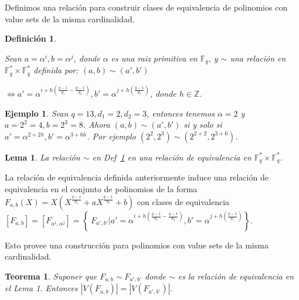 \documentclass[landscape,final,paperwidth=24in,paperheight=36in]{baposter}
\newtheorem*{ejemplo*}{Ejemplo}
\newtheorem{definicion}{Definici\'on}
\newtheorem{lema}{Lema}
\newtheorem{teorema}{Teorema}
\begin{document}
\begin{poster}
{Definimos una relaci\'on para construir clases de equivalencia de polinomios con value sets de la misma cardinalidad.


\begin{definicion}\label{relaci\'on}

  Sean $a = \alpha^i, b = \alpha^j$, donde $\alpha$ es una raiz primitiva en $\mathbb{F}_q$, y $\sim$ una relaci\'on en $\mathbb{F}_q^* \times \mathbb{F}_q^*$ definida por: $(a,b) \sim (a', b')$ 

  $\Longleftrightarrow a' = \alpha^{i+h(\frac{q-1}{d_1} - \frac{q-1}{d_2})}, b' = \alpha^{j+h(\frac{q-1}{d_1})}$, donde $h \in \mathbb{Z}$.

\end{definicion}

  \begin{ejemplo*}
    Sean $q = 13, d_1 = 2, d_2 = 3$, entonces tenemos $\alpha = 2$ y $a = 2^2 = 4, b = 2^3 = 8$. Ahora $(a,b) \sim (a',b')$ si y solo si
    $a' = \alpha^{2+2h}, b' = \alpha^{3+6h}$. Por ejemplo $(2^2,2^3) \sim (2^{2+2},2^{3+6})$.
  \end{ejemplo*}

\begin{lema}
  
  La relaci\'on $\sim$ en Def~\ref{relaci\'on} en una relaci\'on de equivalencia en $\mathbb{F}_q^* \times \mathbb{F}_q^*$.

\end{lema}

  La relaci\'on de equivalencia definida anteriormente induce una relaci\'on de equivalencia en el conjunto de polinomios de la forma $F_{a,b}(X) = X(X^{\frac{q-1}{d_1}} + aX^{\frac{q-1}{d_2}} +b)$ con clases de equivalencia $[F_{a,b}] = [F_{\alpha^i, \alpha^j}] = \left\{\ F_{a',b'} | a' = \alpha^{i+h(\frac{q-1}{d_1} - \frac{q-1}{d_2})}, b' = \alpha^{j+h(\frac{q-1}{d_1})} \right\}$.

  Esto provee una construcci\'{o}n para polinomios con value sets de la misma cardinalidad.
\begin{teorema}
  
  Suponer que $F_{a,b} \sim F_{a',b'}$ donde $\sim$ es la relaci\'on de equivalencia en el Lema 1. Entonces $|V(F_{a,b})| = |V(F_{a',b'})|$.

\end{teorema}
   

 }\label{valuesets}






\end{poster}
\end{document}
